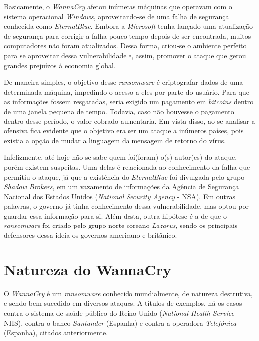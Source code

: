 \documentclass[12pt]{article}
\begin{document}
\noindent
Basicamente, o \textit{WannaCry} afetou inúmeras máquinas que operavam com o sistema operacional \textit{Windows}, aproveitando-se de uma falha de segurança conhecida como \textit{EternalBlue}. Embora a \textit{Microsoft} tenha lançado uma atualização de segurança para corrigir a falha pouco tempo depois de ser encontrada, muitos computadores não foram atualizados. Dessa forma, criou-se o ambiente perfeito para se aproveitar dessa vulnerabilidade e, assim, promover o ataque que gerou grandes prejuízos à economia global.

\noindent
De maneira simples, o objetivo desse \textit{ransomware} é criptografar dados de uma determinada máquina, impedindo o acesso a eles por parte do usuário. Para que as informações fossem resgatadas, seria exigido um pagamento em \textit{bitcoins} dentro de uma janela pequena de tempo. Todavia, caso não houvesse o pagamento dentro desse período, o valor cobrado aumentaria. Em vista disso, ao se analisar a ofensiva fica evidente que o objetivo era ser um ataque a inúmeros países, pois existia a opção de mudar a linguagem da mensagem de retorno do vírus.

\noindent
Infelizmente, até hoje não se sabe quem foi(foram) o(s) autor(es) do ataque, porém existem suspeitas. Uma delas é relacionada ao conhecimento da falha que permitiu o ataque, já que a existência do  \textit{EternalBlue} foi divulgada pelo grupo \textit{Shadow Brokers}, em um vazamento de informações da Agência de Segurança Nacional dos Estados Unidos (\textit{National Security Agency} - NSA). Em outras palavras, o governo já tinha conhecimento dessa vulnerabilidade, mas optou por guardar essa informação para si. Além desta, outra hipótese é a de que o \textit{ransomware} foi criado pelo grupo norte coreano \textit{Lazarus}, sendo os principais defensores dessa ideia os governos americano e britânico.





\section{Natureza do WannaCry} \label{sec:firstpage}
O \textit{WannaCry} é um \textit{ransomware} conhecido mundialmente, de natureza destrutiva, e sendo bem-sucedido em diversos ataques. A títulos de exemplos, há os casos contra o sistema de saúde público do Reino Unido (\textit{National Health Service} - NHS), contra o banco \textit{Santander} (Espanha) e contra a operadora \textit{Telefónica} (Espanha), citados anteriormente.
\end{document}
